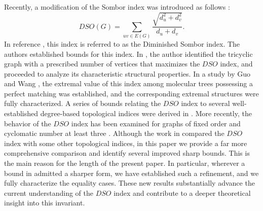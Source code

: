 \documentclass{article}
\theoremstyle{definition}
\begin{document}
  Recently, a modification of the Sombor index was introduced as follows \cite{13}:
 \[
 \displaystyle DSO(G)=\sum_{uv\in E(G)}\frac{\sqrt{d_u^2+d_v^2}}{d_u+d_v}.
 \]
 In reference \cite{3}, this index is referred to as the Diminished Sombor index. The authors established bounds for this index. In \cite{30}, the author identified the tricyclic graph with a prescribed number of vertices that maximizes the $DSO$ index, and proceeded to analyze its characteristic structural properties. In a study by Guo and Wang \cite{31}, the extremal value of this index among molecular trees possessing a perfect matching was established, and the corresponding extremal structures were fully characterized. 
 A series of bounds relating the $DSO$ index to several well-established degree-based topological indices were derived in \cite{5}. More recently, the behavior of the $DSO$ index has been examined for graphs of fixed order and cyclomatic number at least three \cite{33}. Although the work in \cite{5} compared the $DSO$ index with some other topological indices, in this paper we provide a far more comprehensive comparison and identify several improved sharp bounds. This is the main reason for the length of the present paper. In particular, wherever a bound in \cite{5} admitted a sharper form, we have established such a refinement, and we fully characterize the equality cases. These new results substantially advance the current understanding of the $DSO$ index and contribute to a deeper theoretical insight into this invariant.
\end{document}
